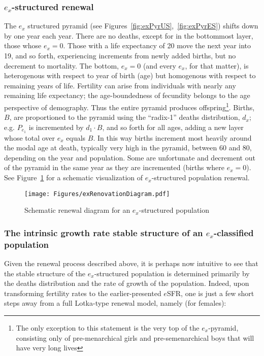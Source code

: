 \subsubsection{$e_x$-structured renewal}
\label{sec:exrenewal}
The $e_x$ structured pyramid (see Figures~\ref{fig:exPyrUS},~\ref{fig:exPyrES})
shifts down by one year each year. There are no deaths, except for in 
the bottommost layer, those whose $e_x = 0$. Those with a life
expectancy of 20 move the next year into 19, and so forth, experiencing
increments from newly added births, but no decrement to mortality. The bottom,
$e_x = 0$ (and every $e_x$, for that matter), is heterogenous with 
respect to year of birth (age) but homogenous with respect to remaining 
years of life. Fertility can arise from individuals with nearly any remaining life
expectancy; the age-boundedness of fecundity belongs to the age
perspective of demography. Thus the entire pyramid produces offspring\footnote{The only exception
to this statement is the very top of the $e_x$-pyramid, consisting only of
pre-menarchical girls and pre-semenarchical boys that will have very long
lives}. Births, $B$, are proportioned to the pyramid using the ``radix-1''
deaths distribution, $d_x$; e.g. $P_{e_1}$ is incremented by $d_1 \cdot B$, and
so forth for all ages, adding a new layer whose total over $e_x$ equals $B$. In this way births
increment most heavily around the modal age at death, typically very high in the
pyramid, between 60 and 80, depending on the year and population. Some are
unfortunate and decrement out of the pyramid in the same year as they are
incremented (births where $e_x = 0$). See Figure~\ref{fig:exrenewal} for a
schematic visualization of $e_x$-structured population renewal.

\begin{figure}
\caption{Schematic renewal diagram for an $e_x$-structured population}
\label{fig:exrenewal}
\texttt{[image: Figures/exRenovationDiagram.pdf]}
\end{figure}

\subsubsection{The intrinsic growth rate stable structure of an
$e_x$-classified population} 
Given the renewal process described above, it is perhaps now intuitive to see
that the stable structure of the $e_x$-structured population is determined
primarily by the deaths distribution and the rate of growth of the
population. Indeed, upon transforming fertility rates to the earlier-presented
$e$SFR, one is just a few short steps away from a full Lotka-type renewal
model, namely (for females):


